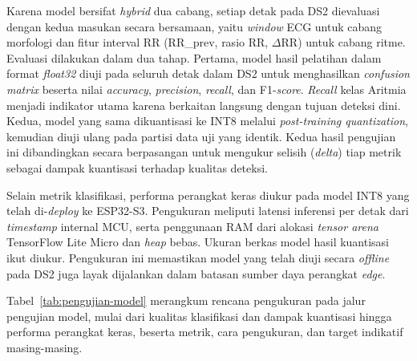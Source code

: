 Karena model bersifat \textit{hybrid} dua cabang, setiap detak pada DS2 dievaluasi dengan kedua masukan secara bersamaan, yaitu \textit{window} ECG untuk cabang morfologi dan fitur interval RR (RR\_prev, rasio RR, $\Delta$RR) untuk cabang ritme. Evaluasi dilakukan dalam dua tahap. Pertama, model hasil pelatihan dalam format \textit{float32} diuji pada seluruh detak dalam DS2 untuk menghasilkan \textit{confusion matrix} beserta nilai \textit{accuracy}, \textit{precision}, \textit{recall}, dan F1-\textit{score}. \textit{Recall} kelas Aritmia menjadi indikator utama karena berkaitan langsung dengan tujuan deteksi dini. Kedua, model yang sama dikuantisasi ke INT8 melalui \textit{post-training quantization}, kemudian diuji ulang pada partisi data uji yang identik. Kedua hasil pengujian ini dibandingkan secara berpasangan untuk mengukur selisih (\textit{delta}) tiap metrik sebagai dampak kuantisasi terhadap kualitas deteksi.

Selain metrik klasifikasi, performa perangkat keras diukur pada model INT8 yang telah di-\textit{deploy} ke ESP32-S3. Pengukuran meliputi latensi inferensi per detak dari \textit{timestamp} internal MCU, serta penggunaan RAM dari alokasi \textit{tensor arena} TensorFlow Lite Micro dan \textit{heap} bebas. Ukuran berkas model hasil kuantisasi ikut diukur. Pengukuran ini memastikan model yang telah diuji secara \textit{offline} pada DS2 juga layak dijalankan dalam batasan sumber daya perangkat \textit{edge}.

Tabel~\ref{tab:pengujian-model} merangkum rencana pengukuran pada jalur pengujian model, mulai dari kualitas klasifikasi dan dampak kuantisasi hingga performa perangkat keras, beserta metrik, cara pengukuran, dan target indikatif masing-masing.

